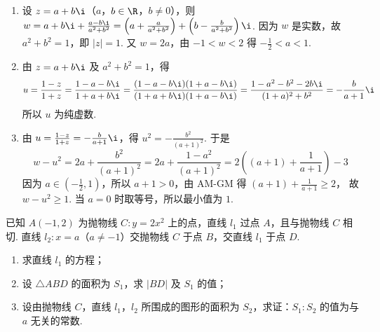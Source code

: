 \begin{solution}
\begin{enumerate}
\item 设 \(z=a+b\i\)（\(a\)，\(b\in\R\)，\(b\neq0\)），则 \(w=a+b\i+\frac{a-b\i}{a^{2}+b^{2}}=\left(a+\frac{a}{a^{2}+b^{2}}\right)+\left(b-\frac{b}{a^{2}+b^{2}}\right)\i\).
因为 \(w\) 是实数，故 \(a^{2}+b^{2}=1\)，即 \(\left|z\right|=1\). 又 \(w=2a\)，由 \(-1<w<2\) 得 \(-\frac{1}{2}<a<1\).

\item 由 \(z=a+b\i\) 及 \(a^{2}+b^{2}=1\)，得
\[
u=\frac{1-z}{1+z}=\frac{1-a-b\i}{1+a+b\i}
=\frac{(1-a-b\i)(1+a-b\i)}{(1+a+b\i)(1+a-b\i)}
=\frac{1-a^{2}-b^{2}-2b\i}{(1+a)^{2}+b^{2}}
=-\frac{b}{a+1}\i
\]
所以 \(u\) 为纯虚数.

\item 由 \(u=\frac{1-z}{1+z}=-\frac{b}{a+1}\i\)，得 \(u^{2}=-\frac{b^{2}}{(a+1)^{2}}\).
于是
\[
w-u^{2}=2a+\frac{b^{2}}{(a+1)^{2}}
=2a+\frac{1-a^{2}}{(a+1)^{2}}
=2\left((a+1)+\frac{1}{a+1}\right)-3
\]
因为 \(a\in\left(-\frac{1}{2},1\right)\)，所以 \(a+1>0\)，由 AM-GM 得 \((a+1)+\frac{1}{a+1}\ge 2\)，
故 \(w-u^{2}\ge1\). 当 \(a=0\) 时取等号，所以最小值为 \(1\).
\end{enumerate}
\end{solution}



\reuseproblemnumber
\begin{problem}[B]
已知 \(A(-1,2)\) 为抛物线 \(C:y=2x^{2}\) 上的点，直线 \(l_{1}\) 过点 \(A\)，且与抛物线 \(C\) 相切. 直线 \(l_{2}:x=a\)（\(a\neq-1\)）交抛物线 \(C\) 于点 \(B\)，交直线 \(l_{1}\) 于点 \(D\).

\begin{enumerate}
\item 求直线 \(l_{1}\) 的方程；
\item 设 \(\triangle ABD\) 的面积为 \(S_{1}\)，求 \(|BD|\) 及 \(S_{1}\) 的值；
\item 设由抛物线 \(C\)，直线 \(l_{1}\)，\(l_{2}\) 所围成的图形的面积为 \(S_{2}\)，求证：\(S_{1}:S_{2}\) 的值为与 \(a\) 无关的常数.
\end{enumerate}
\end{problem}

